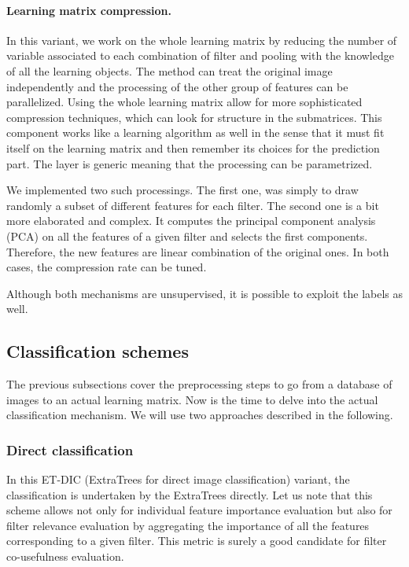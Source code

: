 \documentclass[a4paper]{report}
\begin{document}
		\paragraph{Learning matrix compression.}
		In this variant, we work on the whole learning matrix by reducing the number of variable associated to each combination of filter and pooling with the knowledge of all the learning objects. The method can treat the original image independently and the processing of the other group of features can be parallelized. Using the whole learning matrix allow for more sophisticated compression techniques, which can look for structure in the submatrices. This component works like a learning algorithm as well in the sense that it must fit itself on the learning matrix and then remember its choices for the prediction part.
		The layer is generic meaning that the processing can be parametrized.
		\par
		We implemented two such processings. The first one, was simply to draw randomly a subset of different features for each filter. The second one is a bit more elaborated and complex. It computes the principal component analysis (PCA) on all the features of a given filter and selects the first components. Therefore, the new features are linear combination of the original ones. In both cases, the compression rate can be tuned. 
		\par
		Although both mechanisms are unsupervised, it is possible to exploit the labels as well.
		
		\subsection{Classification schemes}
		The previous subsections cover the preprocessing steps to go from a database of images to an actual learning matrix. Now is the time to delve into the actual classification mechanism. We will use two approaches described in the following. 
		
			\subsubsection{Direct classification}
			In this ET-DIC (ExtraTrees for direct image classification) variant, the classification is undertaken by the ExtraTrees directly.
			Let us note that this scheme allows not only for individual feature importance evaluation but also for filter relevance evaluation by aggregating the importance of all the features corresponding to a given filter. This metric is surely a good candidate for filter co-usefulness evaluation.
\end{document}
